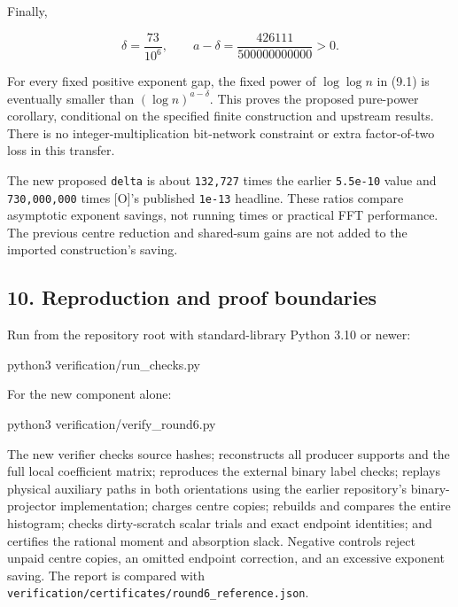\documentclass[
  11pt,
]{article}
\newenvironment{Shaded}{}{}
\newcommand{\ExtensionTok}[1]{#1}
\newcommand{\NormalTok}[1]{#1}
\begin{document}
Finally,

\[
 \delta=\frac{73}{10^6},\qquad
 a-\delta=\frac{426111}{500000000000}>0.
\]

For every fixed positive exponent gap, the fixed power of \(\log\log n\)
in (9.1) is eventually smaller than \((\log n)^{a-\delta}\). This proves
the proposed pure-power corollary, conditional on the specified finite
construction and upstream results. There is no integer-multiplication
bit-network constraint or extra factor-of-two loss in this transfer.

The new proposed \texttt{delta} is about \texttt{132,727} times the
earlier \texttt{5.5e-10} value and \texttt{730,000,000} times {[}O{]}'s
published \texttt{1e-13} headline. These ratios compare asymptotic
exponent savings, not running times or practical FFT performance. The
previous centre reduction and shared-sum gains are not added to the
imported construction's saving.

\subsection{10. Reproduction and proof
boundaries}\label{reproduction-and-proof-boundaries}

Run from the repository root with standard-library Python 3.10 or newer:

\begin{Shaded}
\begin{Highlighting}[]
\ExtensionTok{python3}\NormalTok{ verification/run\_checks.py}
\end{Highlighting}
\end{Shaded}

For the new component alone:

\begin{Shaded}
\begin{Highlighting}[]
\ExtensionTok{python3}\NormalTok{ verification/verify\_round6.py}
\end{Highlighting}
\end{Shaded}

The new verifier checks source hashes; reconstructs all producer
supports and the full local coefficient matrix; reproduces the external
binary label checks; replays physical auxiliary paths in both
orientations using the earlier repository's binary-projector
implementation; charges centre copies; rebuilds and compares the entire
histogram; checks dirty-scratch scalar trials and exact endpoint
identities; and certifies the rational moment and absorption slack.
Negative controls reject unpaid centre copies, an omitted endpoint
correction, and an excessive exponent saving. The report is compared
with \texttt{verification/certificates/round6\_reference.json}.
\end{document}
